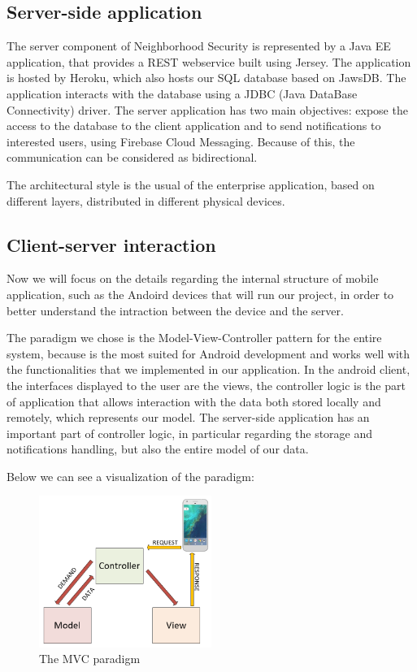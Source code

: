 \documentclass[a4paper]{scrreprt}
\begin{document}
\subsection{Server-side application}
The server component of Neighborhood Security is represented by a Java EE application, that provides a REST webservice built using Jersey. The application is hosted by Heroku, which also hosts our SQL database based on JawsDB. The application interacts with the database using a JDBC (Java DataBase Connectivity) driver. The server application has two main objectives: expose the access to the database to the client application and to send notifications to interested users, using Firebase Cloud Messaging. Because of this, the communication can be considered as bidirectional.
\par The architectural style is the usual of the enterprise application, based on different layers, distributed in different physical devices.

\subsection{Client-server interaction}
Now we will focus on the details regarding the internal structure of mobile application, such as the Andoird devices that will run our project, in order to better understand the intraction between the device and the server.
\par The paradigm we chose is the Model-View-Controller pattern for the entire system, because is the most suited for Android development and works well with the functionalities that we implemented in our application. In the android client, the interfaces displayed to the user are the views, the controller logic is the part of application that allows interaction with the data both stored locally and remotely, which represents our model. The server-side application has an important part of controller logic, in particular regarding the storage and notifications handling, but also the entire model of our data.
\par Below we can see a visualization of the paradigm:

\begin{figure}[H]
	\centering
	\includegraphics[width=0.5\textwidth]{imgs/mvc}
	\caption{The MVC paradigm}
\end{figure}
\end{document}
